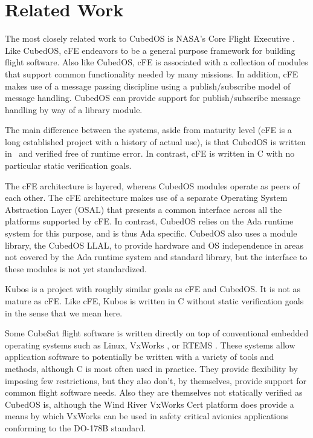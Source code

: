 
\section{Related Work}
\label{section-related-work}

The most closely related work to CubedOS is NASA's Core Flight Executive \cite{cFE}. Like
CubedOS, cFE endeavors to be a general purpose framework for building flight software. Also like
CubedOS, cFE is associated with a collection of modules that support common functionality needed
by many missions. In addition, cFE makes use of a message passing discipline using a
publish/subscribe model of message handling. CubedOS can provide support for publish/subscribe
message handling by way of a library module.

The main difference between the systems, aside from maturity level (cFE is a long established
project with a history of actual use), is that CubedOS is written in \SPARK\ and verified free
of runtime error. In contrast, cFE is written in C with no particular static verification goals.

The cFE architecture is layered, whereas CubedOS modules operate as peers of each other. The cFE
architecture makes use of a separate Operating System Abstraction Layer (OSAL) that presents a
common interface across all the platforms supported by cFE. In contrast, CubedOS relies on the
Ada runtime system for this purpose, and is thus Ada specific. CubedOS also uses a module
library, the CubedOS LLAL, to provide hardware and OS independence in areas not covered by the
Ada runtime system and standard library, but the interface to these modules is not yet
standardized.

Kubos \cite{kubos} is a project with roughly similar goals as cFE and CubedOS. It is not as
mature as cFE. Like cFE, Kubos is written in C without static verification goals in the sense
that we mean here.

Some CubeSat flight software is written directly on top of conventional embedded operating
systems such as Linux, VxWorks \cite{vxworks}, or RTEMS \cite{rtems}. These systems allow
application software to potentially be written with a variety of tools and methods, although C
is most often used in practice. They provide flexibility by imposing few restrictions, but they
also don't, by themselves, provide support for common flight software needs. Also they are
themselves not statically verified as CubedOS is, although the Wind River VxWorks Cert platform
\cite{vxworks-cert} does provide a means by which VxWorks can be used in safety critical
avionics applications conforming to the DO-178B standard.

